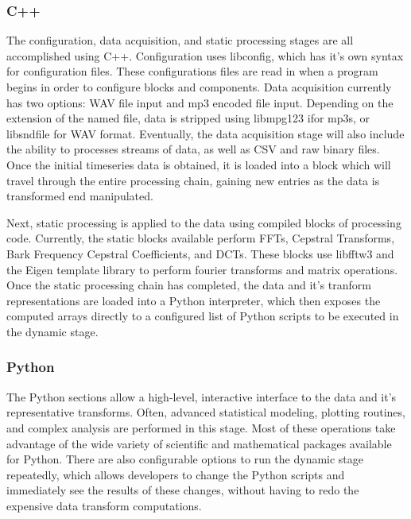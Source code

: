 \documentclass[journal]{IEEEtran}
\begin{document}
\subsubsection{C++}
The configuration, data acquisition, and static processing stages are all accomplished using C++. Configuration uses libconfig, which 
has it's own syntax for configuration files. These configurations files are read in when a program begins in order to configure blocks and 
components. Data acquisition currently has two options: WAV file input and mp3 encoded file input. Depending on the extension of the named file, 
data is stripped using libmpg123 ifor mp3s, or libsndfile for WAV format. Eventually, the data acquisition stage will also include the ability to processes streams of data, as well as CSV and raw binary files. Once the initial timeseries data is obtained, it is loaded into a block which will travel through the entire processing chain, gaining new entries as the data is transformed end manipulated. 

Next, static processing is applied to the data using compiled blocks of processing code. Currently, the static blocks available perform FFTs, 
Cepstral Transforms, Bark Frequency Cepstral Coefficients, and DCTs. These blocks use libfftw3 and the Eigen template library to perform 
fourier transforms and matrix operations. Once the static processing chain has completed, the data and it's tranform representations are 
loaded into a Python interpreter, which then exposes the computed arrays directly to a configured list of Python scripts to be executed in the dynamic
stage.

\subsubsection{Python}
The Python sections allow a high-level, interactive interface to the data and it's representative transforms. Often, advanced statistical modeling, 
plotting routines, and complex analysis are performed in this stage. Most of these operations take advantage of the wide variety of scientific 
and mathematical packages available for Python. There are also configurable options to run the dynamic stage repeatedly, which allows developers to change the Python scripts and immediately see the results of these changes, without having to redo the expensive data transform computations.
\end{document}
